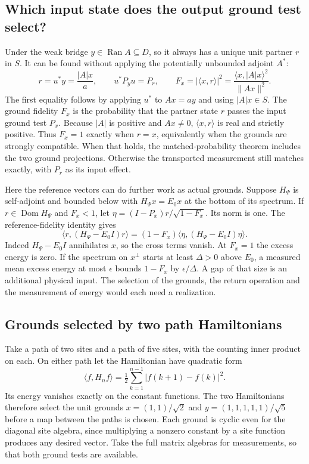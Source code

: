 \documentclass[11pt]{article}
\theoremstyle{definition}
\DeclareMathOperator{\Ran}{Ran}
\begin{document}
\subsection{Which input state does the output ground test select?}

Under the weak bridge $y\in\Ran A\subseteq D$, so it always has a unique unit partner $r$ in $S$. It can be found without applying the potentially unbounded adjoint $A^*$:
\begin{equation}
 r=u^*y=\frac{|A|x}{a},\qquad
 u^*P_y u=P_r,\qquad
 F_x=|\langle x,r\rangle|^2
   =\frac{\langle x,|A|x\rangle^2}{\|Ax\|^2}.
 \label{eq:actual-ground-partner}
\end{equation}
The first equality follows by applying $u^*$ to $Ax=ay$ and using $|A|x\in S$. The ground fidelity $F_x$ is the probability that the partner state $r$ passes the input ground test $P_x$. Because $|A|$ is positive and $Ax\ne0$, $\langle x,r\rangle$ is real and strictly positive. Thus $F_x=1$ exactly when $r=x$, equivalently when the grounds are strongly compatible. When that holds, the matched-probability theorem includes the two ground projections. Otherwise the transported measurement still matches exactly, with $P_r$ as its input effect.

Here the reference vectors can do further work as actual grounds. Suppose $H_\Psi$ is self-adjoint and bounded below with $H_\Psi x=E_0x$ at the bottom of its spectrum. If $r\in\operatorname{Dom}H_\Psi$ and $F_x<1$, let $\eta=(I-P_x)r/\sqrt{1-F_x}$. Its norm is one. The reference-fidelity identity gives
\begin{equation}
 \langle r,(H_\Psi-E_0 I)r\rangle
   =(1-F_x)\langle\eta,(H_\Psi-E_0 I)\eta\rangle .
 \label{eq:ground-return-energy}
\end{equation}
Indeed $H_\Psi-E_0 I$ annihilates $x$, so the cross terms vanish. At $F_x=1$ the excess energy is zero. If the spectrum on $x^\perp$ starts at least $\Delta>0$ above $E_0$, a measured mean excess energy at most $\epsilon$ bounds $1-F_x$ by $\epsilon/\Delta$. A gap of that size is an additional physical input. The selection of the grounds, the return operation and the measurement of energy would each need a realization.

\subsection{Grounds selected by two path Hamiltonians}

Take a path of two sites and a path of five sites, with the counting inner product on each. On either path let the Hamiltonian have quadratic form
\[
 \langle f,H_n f\rangle=\tfrac12\sum_{k=1}^{n-1}|f(k+1)-f(k)|^2 .
\]
Its energy vanishes exactly on the constant functions. The two Hamiltonians therefore select the unit grounds $x=(1,1)/\sqrt2$ and $y=(1,1,1,1,1)/\sqrt5$ before a map between the paths is chosen. Each ground is cyclic even for the diagonal site algebra, since multiplying a nonzero constant by a site function produces any desired vector. Take the full matrix algebras for measurements, so that both ground tests are available.
\end{document}
